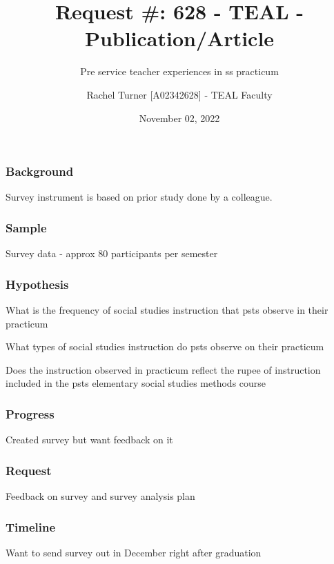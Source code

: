\documentclass[
]{article}
\title{Request \#: 628 - TEAL - Publication/Article}
\subtitle{Pre service teacher experiences in ss practicum}
\author{Rachel Turner {[}A02342628{]} - TEAL Faculty}
\date{November 02, 2022}
\begin{document}
\maketitle

\hypertarget{background}{%
\subsubsection{Background}\label{background}}

Survey instrument is based on prior study done by a colleague.

\hypertarget{sample}{%
\subsubsection{Sample}\label{sample}}

Survey data - approx 80 participants per semester

\hypertarget{hypothesis}{%
\subsubsection{Hypothesis}\label{hypothesis}}

What is the frequency of social studies instruction that psts observe in
their practicum

What types of social studies instruction do psts observe on their
practicum

Does the instruction observed in practicum reflect the rupee of
instruction included in the psts elementary social studies methods
course

\hypertarget{progress}{%
\subsubsection{Progress}\label{progress}}

Created survey but want feedback on it

\hypertarget{request}{%
\subsubsection{Request}\label{request}}

Feedback on survey and survey analysis plan

\hypertarget{timeline}{%
\subsubsection{Timeline}\label{timeline}}

Want to send survey out in December right after graduation
\end{document}
